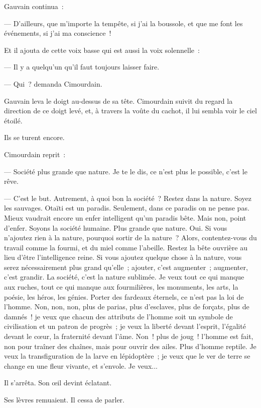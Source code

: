 \documentclass[french,twoside]{book} %
\begin{document}
Gauvain continua :\par
— D’ailleurs, que m’importe la tempête, si j’ai la boussole, et que me font les événements, si j’ai ma conscience !\par
Et il ajouta de cette voix basse qui est aussi la voix solennelle :\par
— Il y a quelqu’un qu’il faut toujours laisser faire.\par
— Qui ? demanda Cimourdain.\par
Gauvain leva le doigt au-dessus de sa tête. Cimourdain suivit du regard la direction de ce doigt levé, et, à travers la voûte du cachot, il lui sembla voir le ciel étoilé.\par
Ils se turent encore.\par
Cimourdain reprit :\par
— Société plus grande que nature. Je te le dis, ce n’est plus le possible, c’est le rêve.\par
— C’est le but. Autrement, à quoi bon la société ?  Restez dans la nature. Soyez les sauvages. Otaïti est un paradis. Seulement, dans ce paradis on ne pense pas. Mieux vaudrait encore un enfer intelligent qu’un paradis bête. Mais non, point d’enfer. Soyons la société humaine. Plus grande que nature. Oui. Si vous n’ajoutez rien à la nature, pourquoi sortir de la nature ? Alors, contentez-vous du travail comme la fourmi, et du miel comme l’abeille. Restez la bête ouvrière au lieu d’être l’intelligence reine. Si vous ajoutez quelque chose à la nature, vous serez nécessairement plus grand qu’elle ; ajouter, c’est augmenter ; augmenter, c’est grandir. La société, c’est la nature sublimée. Je veux tout ce qui manque aux ruches, tout ce qui manque aux fourmilières, les monuments, les arts, la poésie, les héros, les génies. Porter des fardeaux éternels, ce n’est pas la loi de l’homme. Non, non, non, plus de parias, plus d’esclaves, plus de forçats, plus de damnés ! je veux que chacun des attributs de l’homme soit un symbole de civilisation et un patron de progrès ; je veux la liberté devant l’esprit, l’égalité devant le cœur, la fraternité devant l’âme. Non ! plus de joug ! l’homme est fait, non pour traîner des chaînes, mais pour ouvrir des ailes. Plus d’homme reptile. Je veux la transfiguration de la larve en lépidoptère ; je veux que le ver de terre se change en une fleur vivante, et s’envole. Je veux...\par
Il s’arrêta. Son œil devint éclatant.\par
Ses lèvres remuaient. Il cessa de parler.\par
\end{document}
